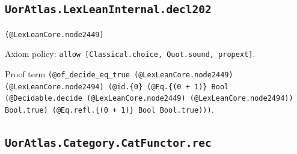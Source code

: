\documentclass[11pt]{article}
\begin{document}
\subsection*{\texttt{UorAtlas.LexLeanInternal.decl202}}
\noindent\texttt{(@LexLeanCore.node2449)}\par
\noindent Axiom policy: \texttt{allow [Classical.choice, Quot.sound, propext]}.\par
\noindent Proof term \texttt{(@of\_decide\_eq\_true (@LexLeanCore.node2449) (@LexLeanCore.node2494) (@id.\{0\} (@Eq.\{(0 + 1)\} Bool (@Decidable.decide (@LexLeanCore.node2449) (@LexLeanCore.node2494)) Bool.true) (@Eq.refl.\{(0 + 1)\} Bool Bool.true)))}.\par
\subsection*{\texttt{UorAtlas.Category.CatFunctor.rec}}
\end{document}
